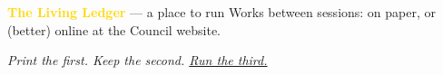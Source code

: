 \documentclass[11pt]{article}
\newcommand{\deco}{\textcolor{gold}{\ding{72}}}       %
\newcommand{\add}[1]{\textcolor{inkgreen}{\uline{#1}}}
\begin{document}
\begin{tcolorbox}[enhanced,sharp corners,colback=navy,colframe=navy,
    coltext=cream,boxrule=0pt,borderline west={2.5pt}{0pt}{gold},
    left=5mm,right=5mm,top=3.5mm,bottom=3.5mm]
  \textbf{\textcolor{gold}{The Living Ledger}} --- a place to run Works between
  sessions: on paper, or (better) online at the Council website.
\end{tcolorbox}

\begin{center}\itshape Print the first. Keep the second. \add{Run the third.}\end{center}

\vfill
\begin{center}\deco\end{center}
\end{document}
